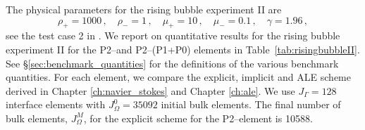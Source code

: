 The physical parameters for the rising bubble experiment II are
\begin{equation} \label{eq:Hysing2}
\rho_+ = 1000\,,\quad \rho_- = 1\,,\quad \mu_+ = 10\,,\quad \mu_- = 0.1\,,\quad
\gamma = 1.96\,,
\end{equation}
see the test case 2 in \cite[Table~I]{HysingTKPBGT09}. We report on
quantitative results for the rising bubble experiment II for the P2--\pdg and
P2--(P1+P0) elements in Table~\ref{tab:risingbubbleII}. See
\S\ref{sec:benchmark_quantities} for the definitions of the various benchmark
quantities. For each element, we compare the explicit, implicit and ALE scheme
derived in Chapter \ref{ch:navier_stokes} and Chapter \ref{ch:ale}. We use
$J_\Gamma=128$ interface elements with $J_\Omega^0=35092$ initial bulk elements.
The final number of bulk elements, $J_\Omega^M$, for the explicit scheme for
the P2--\pdg element is 10588.

